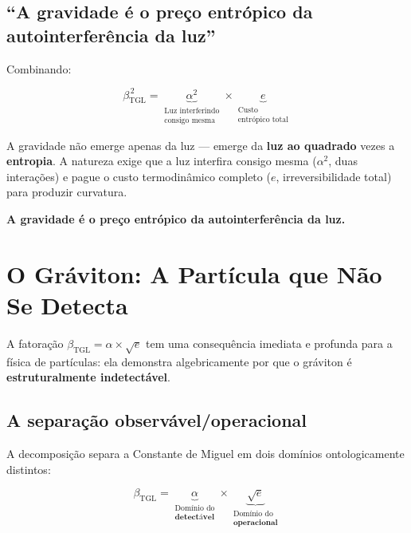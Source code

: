\documentclass[12pt,a4paper,twoside]{article}
\newcommand{\betatgl}{\beta_{\!\scriptscriptstyle\mathrm{TGL}}}
\begin{document}
\subsection{``A gravidade é o preço entrópico da autointerferência da luz''}

Combinando:

\begin{conclusionbox}[title={Síntese Quadrática}]
\begin{equation}
\betatgl^{\,2} = \underbrace{\alpha^2}_{\substack{\text{Luz interferindo}\\\text{consigo mesma}}} \times \underbrace{e}_{\substack{\text{Custo}\\\text{entrópico total}}}
\end{equation}

A gravidade não emerge apenas da luz --- emerge da \textbf{luz ao quadrado} vezes a \textbf{entropia}. A natureza exige que a luz interfira consigo mesma ($\alpha^2$, duas interações) e pague o custo termodinâmico completo ($e$, irreversibilidade total) para produzir curvatura.

\medskip
\textbf{A gravidade é o preço entrópico da autointerferência da luz.}
\end{conclusionbox}



\section{O Gráviton: A Partícula que Não Se Detecta}
\label{sec:graviton}

A fatoração $\betatgl = \alpha \times \sqrt{e}$ tem uma consequência imediata e profunda para a física de partículas: ela demonstra algebricamente por que o gráviton é \textbf{estruturalmente indetectável}.

\subsection{A separação observável/operacional}

A decomposição separa a Constante de Miguel em dois domínios ontologicamente distintos:

\begin{factorbox}[title={Dois domínios}]
\begin{equation}
\betatgl = \underbrace{\alpha}_{\substack{\text{Domínio do}\\\textbf{detectável}}} \times \underbrace{\sqrt{e}}_{\substack{\text{Domínio do}\\\textbf{operacional}}}
\end{equation}
\end{factorbox}
\end{document}
